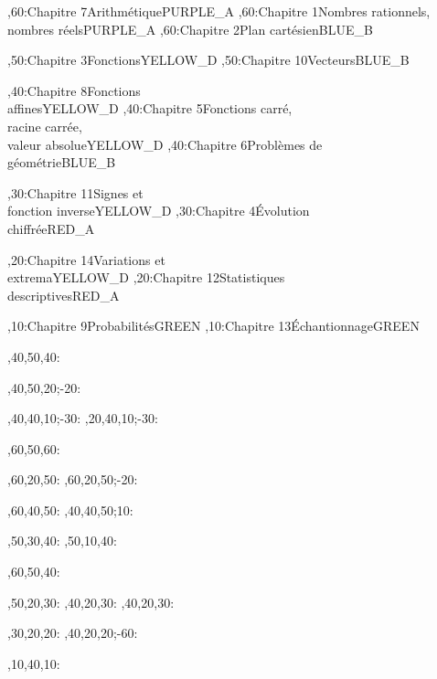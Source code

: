 \documentclass[tikz]{standalone}
\begin{document}
%
	\begin{chart}
	,60:{Chapitre 7}{Arithmétique}{}{PURPLE_A}
	,60:{Chapitre 1}{Nombres rationnels, \\ nombres réels}{}{PURPLE_A}
	,60:{Chapitre 2}{Plan cartésien}{}{BLUE_B}
	
	,50:{Chapitre 3}{Fonctions}{}{YELLOW_D}
	,50:{Chapitre 10}{Vecteurs}{}{BLUE_B}
	
	,40:{Chapitre 8}{Fonctions \\ affines}{}{YELLOW_D}
	,40:{Chapitre 5}{Fonctions carré, \\ racine carrée, \\ valeur absolue}{}{YELLOW_D}
	,40:{Chapitre 6}{Problèmes de \\ géométrie}{}{BLUE_B}
	
	,30:{Chapitre 11}{Signes et \\ fonction inverse}{}{YELLOW_D}
	,30:{Chapitre 4}{Évolution \\ chiffrée}{}{RED_A}
	
	,20:{Chapitre 14}{Variations et \\ extrema}{}{YELLOW_D}
	,20:{Chapitre 12}{Statistiques \\ descriptives}{}{RED_A}
	
	,10:{Chapitre 9}{Probabilités}{}{GREEN}
	,10:{Chapitre 13}{Échantionnage}{}{GREEN}
	
	
	
	
	,40,50,40:
	
	
	
	,40,50,20;-20:
	
	,40,40,10;-30:
	,20,40,10;-30:

	,60,50,60:
	
	,60,20,50:
	,60,20,50;-20:
	
	,60,40,50:
	,40,40,50;10:
	
	,50,30,40:
	,50,10,40:
	
	,60,50,40:
	
	,50,20,30:
	,40,20,30:
	,40,20,30:
	
	,30,20,20:
	,40,20,20;-60:
	
	,10,40,10:
	
	\end{chart}
%
\end{document}

